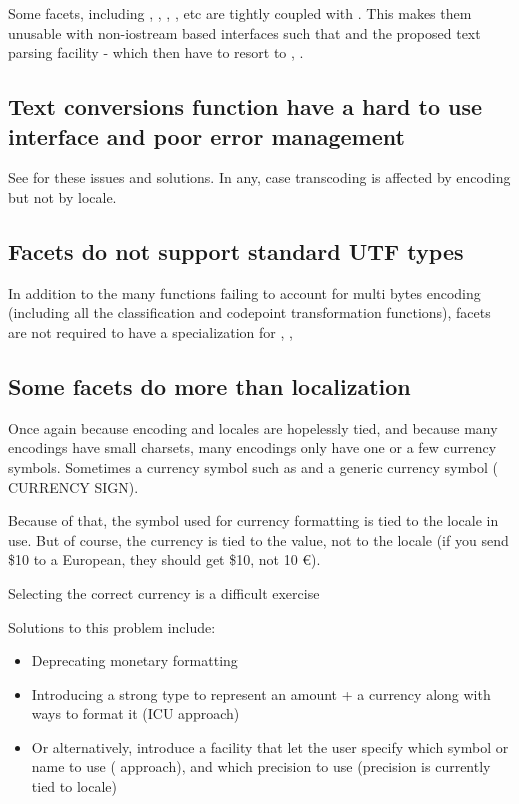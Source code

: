 \documentclass{wg21}
\newcommand{\UnicodeLetter}[1]{\textbf{\textcolor{BrickRed}{\Large\tcode{#1}}}}
\begin{document}
Some facets, including , , , , etc are tightly coupled with .
This makes them unusable with non-iostream based interfaces such that  and the proposed text parsing facility \cite{P1729R1} - which then have to resort to , .

\subsection{Text conversions function have a hard to use interface and poor error management}

See \cite{P1629R0} for these issues and solutions.
In any, case transcoding is affected by encoding but not by locale.
\subsection{Facets do not support standard UTF types}

In addition to the many functions failing to account for multi bytes encoding (including all the classification and codepoint transformation functions), facets are not required to have a specialization for , , 

\subsection{Some facets do more than localization}
Once again because encoding and locales are hopelessly tied, and because many encodings have small charsets, many encodings only have one or a few currency symbols. Sometimes a currency symbol such as \UnicodeLetter{\$} and a generic currency symbol (\UnicodeLetter{¤} CURRENCY SIGN).

Because of that, the symbol used for currency formatting is tied to the locale in use.
But of course, the currency is tied to the value, not to the locale (if you send \$10 to a European, they should get \$10, not 10 €).

Selecting the correct currency is a difficult exercise \cite{Stackoverflow}

Solutions to this problem include:

\begin{itemize}
    \item Deprecating monetary formatting
    \item Introducing a strong type to represent an amount + a currency along with ways to format it (ICU approach)
    \item Or alternatively, introduce a facility that let the user specify which symbol or name to use (\cite{QLocale} approach), and which precision to use (precision is currently tied to locale)
\end{itemize}
\end{document}
